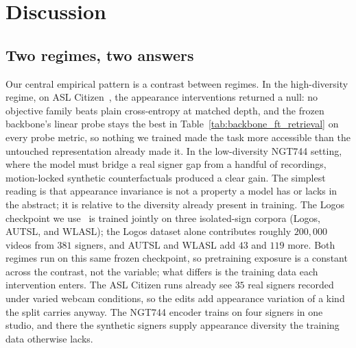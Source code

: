 \chapter{Discussion}
\label{chap:discussion}

\section{Two regimes, two answers}
\label{sec:discussion-regimes}
Our central empirical pattern is a contrast between regimes. In the high-diversity regime, on
ASL Citizen~\cite{aslcitizen}, the appearance interventions returned a null: no
objective family beats plain cross-entropy at matched depth, and the
frozen backbone's linear probe stays the best in
Table~\ref{tab:backbone_ft_retrieval} on every probe metric, so nothing we
trained made the task more accessible than the untouched representation
already made it. In the
low-diversity NGT744 setting, where the model must bridge a real signer gap from a
handful of recordings, motion-locked synthetic counterfactuals produced
a clear gain. The simplest reading is that appearance invariance is not a
property a model has or lacks in the abstract; it is relative to the
diversity already present in training. The Logos checkpoint we
use~\cite{ovodovLogosWellTemperedPretrain2025} is trained jointly on three
isolated-sign corpora (Logos, AUTSL, and WLASL); the Logos dataset alone
contributes roughly $200{,}000$ videos from $381$ signers, and AUTSL and
WLASL add $43$ and $119$ more.
Both regimes run on this same frozen checkpoint, so pretraining exposure
is a constant across the contrast, not the variable; what differs is the
training data each intervention enters. The ASL Citizen runs already see
$35$ real signers recorded under varied webcam conditions, so the edits
add appearance variation of a kind the split carries anyway. The NGT744
encoder trains on four signers in one studio, and there the synthetic
signers supply appearance diversity the training data otherwise lacks.


